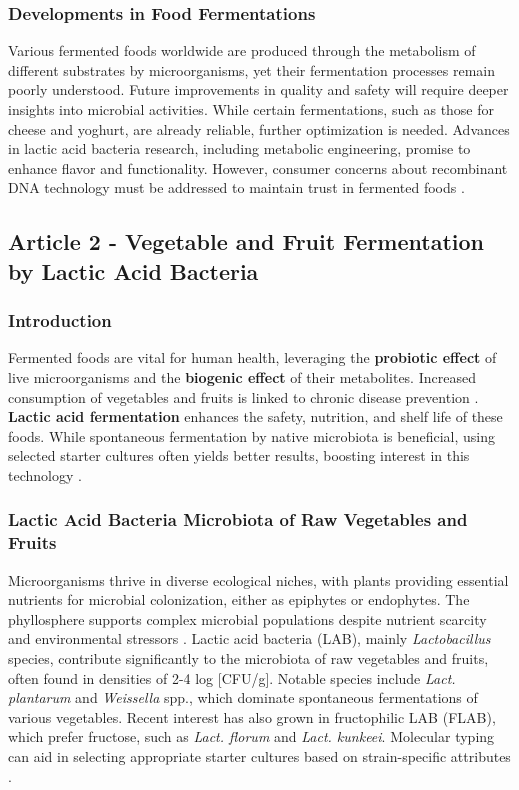 \subsubsection*{Developments in Food Fermentations}
Various fermented foods worldwide are produced through the metabolism of different substrates by microorganisms, yet their fermentation processes remain poorly understood. Future improvements in quality and safety will require deeper insights into microbial activities. While certain fermentations, such as those for cheese and yoghurt, are already reliable, further optimization is needed. Advances in lactic acid bacteria research, including metabolic engineering, promise to enhance flavor and functionality. However, consumer concerns about recombinant DNA technology must be addressed to maintain trust in fermented foods \cite*{L8-MicroInFood}.

\subsection{Article 2 - Vegetable and Fruit Fermentation by Lactic Acid Bacteria }
\subsubsection*{Introduction}
Fermented foods are vital for human health, leveraging the \textbf{probiotic effect} of live microorganisms and the \textbf{biogenic effect} of their metabolites. Increased consumption of vegetables and fruits is linked to chronic disease prevention \cite*{L8-VegFruit}. \textbf{Lactic acid fermentation} enhances the safety, nutrition, and shelf life of these foods. While spontaneous fermentation by native microbiota is beneficial, using selected starter cultures often yields better results, boosting interest in this technology \cite*{L8-VegFruit}.

\subsubsection{Lactic Acid Bacteria Microbiota of Raw Vegetables and Fruits}
Microorganisms thrive in diverse ecological niches, with plants providing essential nutrients for microbial colonization, either as epiphytes or endophytes. The phyllosphere supports complex microbial populations despite nutrient scarcity and environmental stressors \cite*{L8-VegFruit}. Lactic acid bacteria (LAB), mainly \textit{Lactobacillus} species, contribute significantly to the microbiota of raw vegetables and fruits, often found in densities of 2-4 log [CFU/g]. Notable species include \textit{Lact. plantarum} and \textit{Weissella} spp., which dominate spontaneous fermentations of various vegetables. Recent interest has also grown in fructophilic LAB (FLAB), which prefer fructose, such as \textit{Lact. florum} and \textit{Lact. kunkeei}. Molecular typing can aid in selecting appropriate starter cultures based on strain-specific attributes \cite*{L8-VegFruit}.

